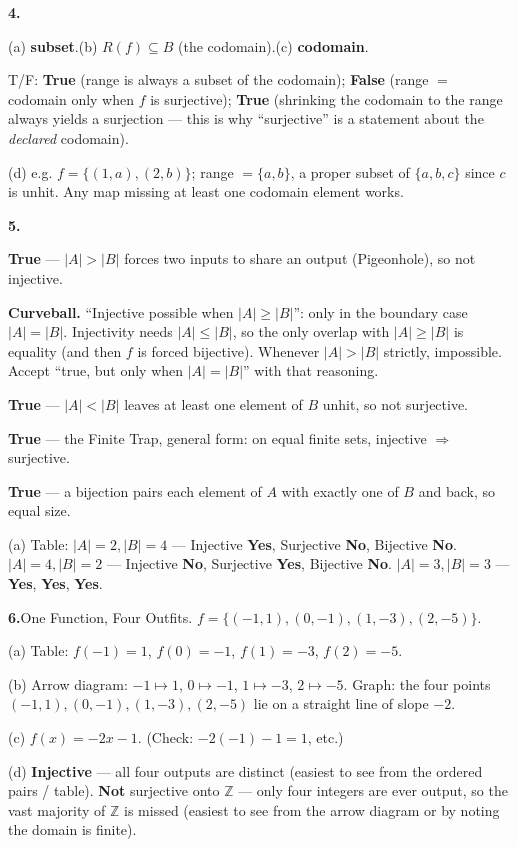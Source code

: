\documentclass[12pt]{article}
\begin{document}
\bigskip
\textbf{4.}

(a)\; \textbf{subset}.\quad (b)\; $R(f) \subseteq B$ (the codomain).\quad (c)\; \textbf{codomain}.

T/F: \textbf{True} (range is always a subset of the codomain); \textbf{False} (range $=$ codomain only when $f$
is surjective); \textbf{True} (shrinking the codomain to the range always yields a surjection --- this is why
``surjective'' is a statement about the \textit{declared} codomain).

(d)\; e.g. $f = \{(1,a),(2,b)\}$; range $= \{a,b\}$, a proper subset of $\{a,b,c\}$ since $c$ is unhit. Any map
missing at least one codomain element works.

\bigskip
\textbf{5.}

\textbf{True} --- $|A|>|B|$ forces two inputs to share an output (Pigeonhole), so not injective.

\textbf{Curveball.} ``Injective possible when $|A|\ge|B|$'': only in the boundary case $|A|=|B|$. Injectivity
needs $|A|\le|B|$, so the only overlap with $|A|\ge|B|$ is equality (and then $f$ is forced bijective). Whenever
$|A|>|B|$ strictly, impossible. Accept ``true, but only when $|A|=|B|$'' with that reasoning.

\textbf{True} --- $|A|<|B|$ leaves at least one element of $B$ unhit, so not surjective.

\textbf{True} --- the Finite Trap, general form: on equal finite sets, injective $\Rightarrow$ surjective.

\textbf{True} --- a bijection pairs each element of $A$ with exactly one of $B$ and back, so equal size.

(a)\; Table: $|A|=2,|B|=4$ --- Injective \textbf{Yes}, Surjective \textbf{No}, Bijective \textbf{No}.\;
$|A|=4,|B|=2$ --- Injective \textbf{No}, Surjective \textbf{Yes}, Bijective \textbf{No}.\;
$|A|=3,|B|=3$ --- \textbf{Yes}, \textbf{Yes}, \textbf{Yes}.

\bigskip
\textbf{6.}\quad One Function, Four Outfits. $f = \{(-1,1),(0,-1),(1,-3),(2,-5)\}$.

(a)\; Table: $f(-1)=1$, $f(0)=-1$, $f(1)=-3$, $f(2)=-5$.

(b)\; Arrow diagram: $-1\mapsto 1$, $0\mapsto -1$, $1\mapsto -3$, $2\mapsto -5$. Graph: the four points
$(-1,1),(0,-1),(1,-3),(2,-5)$ lie on a straight line of slope $-2$.

(c)\; $f(x) = -2x - 1$. (Check: $-2(-1)-1 = 1$, etc.)

(d)\; \textbf{Injective} --- all four outputs are distinct (easiest to see from the ordered pairs / table).
\textbf{Not} surjective onto $\mathbb{Z}$ --- only four integers are ever output, so the vast majority of
$\mathbb{Z}$ is missed (easiest to see from the arrow diagram or by noting the domain is finite).
\end{document}
